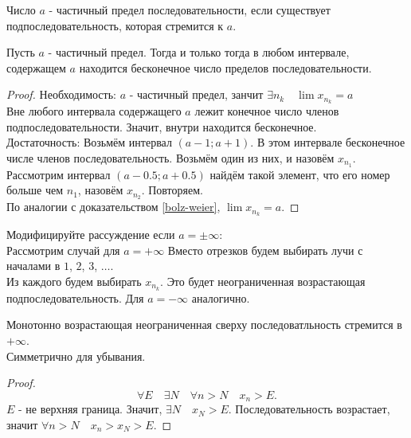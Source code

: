\documentclass[11pt, oneside]{article}   	%
\begin{document}
    \begin{definition}
        Число $a$ - частичный предел последовательности, если существует подпоследовательность, которая стремится к $a$.\\
    \end{definition}
    \begin{theorem}
        Пусть $a$ - частичный предел. Тогда и только тогда в любом интервале, содержащем $a$ находится бесконечное число пределов последовательности.
        \begin{proof}
            Необходимость:
                $a$ - частичный предел, занчит $\exists{n_k}\quad \lim x_{n_k} = a$\\
                Вне любого интервала содержащего $a$ лежит конечное число членов подпоследовательности. Значит, внутри находится бесконечное.\\
            Достаточность:
            Возьмём интервал $\left( a-1; a+1 \right) $. В этом интервале бесконечное числе членов последовательность. Возьмём один из них, и назовём $x_{n_1}$.\\
            Рассмотрим интервал $\left( a-0.5; a+0.5\right) $ найдём такой элемент, что его номер больше чем $n_1$, назовём $x_{n_2}$. Повторяем.\\
        По аналогии с доказательством \ref{bolz-weier}, $\lim x_{n_k} = a$.
        \end{proof}
        \begin{problem}
            Модифицируйте рассуждение если $a=\pm\infty$:\\
            Рассмотрим случай для $a=+\infty$
            Вместо отрезков будем выбирать лучи с началами в $1$,  $2$,  $3$,  $\ldots$.\\
            Из каждого будем выбирать $x_{n_k}$. Это будет неограниченная возрастающая подпоследовательность. Для $a=-\infty$ аналогично.
        \end{problem}
    \end{theorem}
    \begin{tlemma}\label{monolim}
        Монотонно возрастающая неограниченная сверху последоватльность стремится в $+\infty$.\\
        Симметрично для убывания.\\
        \begin{proof}
            \[ \forall{E}\quad \exists{N}\quad \forall{n>N}\quad x_n>E .\]
            $E$ - не верхняя граница. Значит, $\exists{N}\quad x_N > E$. Последовательность возрастает, значит $\forall{n > N}\quad x_n > x_N > E$. 
        \end{proof}
    \end{tlemma}
\end{document}
